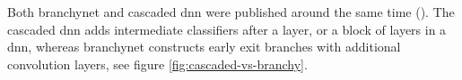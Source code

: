 Both \gls{branchynet} \cite{teerapittayanon_branchynet:_2016} and cascaded \gls{dnn} \cite{leroux_resource-constrained_2015} were published around the same time (\citeyear{teerapittayanon_branchynet:_2016,leroux_resource-constrained_2015}). The cascaded \gls{dnn} adds intermediate classifiers after a layer, or a block of layers in a \gls{dnn}, whereas \gls{branchynet} constructs early exit branches with additional convolution layers, see figure \ref{fig:cascaded-vs-branchy}.

\begin{figure}
	\centering

\end{figure}
